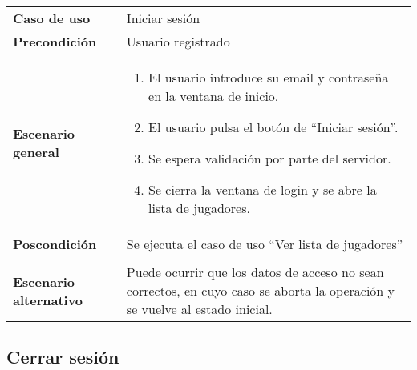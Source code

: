 {\footnotesize
\begin{tabularx}{0.95\textwidth}{p{}|X}

\textbf{Caso de uso} & Iniciar sesión \\

\textbf{Precondición} & Usuario registrado \\

\textbf{Escenario general} & \begin{enumerate}
\item El usuario introduce su email y contraseña en la ventana de inicio.
\item El usuario pulsa el botón de ``Iniciar sesión''.
\item Se espera validación por parte del servidor.
\item Se cierra la ventana de login y se abre la lista de jugadores.
\end{enumerate} \\

\textbf{Poscondición} & Se ejecuta el caso de uso ``Ver lista de jugadores''
\\ \\

\textbf{Escenario alternativo} & Puede ocurrir que los datos de acceso no sean
correctos, en cuyo caso se aborta la operación y se vuelve al estado inicial.

\end{tabularx}
}

\subsection{Cerrar sesión}

